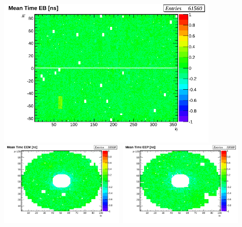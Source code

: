 \begin{center}
\centering
\mbox{\includegraphics[height=0.50\textwidth, width=0.80\textwidth]{THESISPLOTS/calibDiffMapEB_Before_Calibration.png}}
\mbox{\includegraphics[height=0.52\textwidth, width=0.45\textwidth]{THESISPLOTS/calibDiffMapEEM_Before_CALIB.png} \quad
\includegraphics[height=0.52\textwidth, width=0.45\textwidth]{THESISPLOTS/calibDiffMapEEP_Before_CALIB.png}
}
\clearpage


\end{center}
